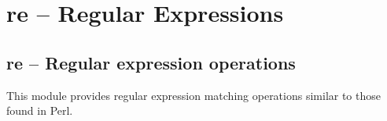 
\chapter{re -- Regular Expressions}

\section{re -- Regular expression operations}

This module provides regular expression
matching operations similar to those found in Perl.

